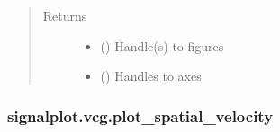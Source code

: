 \documentclass[letterpaper,10pt,english]{sphinxmanual}
\begin{document}
\begin{fulllineitems}
\begin{quote}
\begin{description}
\begin{itemize}
\end{itemize}

\item[{Returns}] \leavevmode
\sphinxAtStartPar
\begin{itemize}
\item {} 
\sphinxAtStartPar
{} () \textendash{} Handle(s) to figures

\item {} 
\sphinxAtStartPar
{} () \textendash{} Handles to axes

\end{itemize}


\end{description}\end{quote}

\end{fulllineitems}



\subsubsection{signalplot.vcg.plot\_spatial\_velocity}
\label{\detokenize{_autosummary/signalplot.vcg.plot_spatial_velocity:signalplot-vcg-plot-spatial-velocity}}\label{\detokenize{_autosummary/signalplot.vcg.plot_spatial_velocity::doc}}
\end{document}
